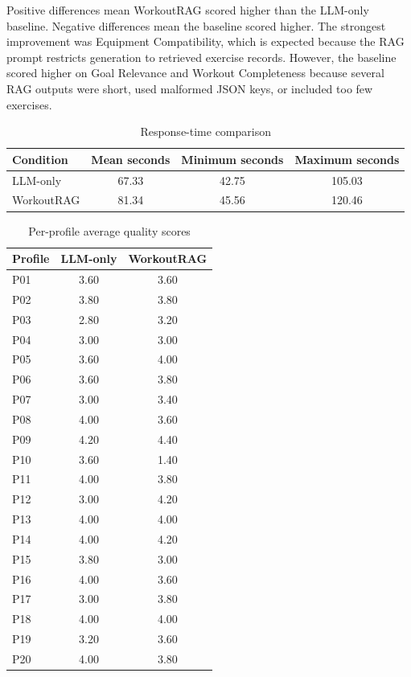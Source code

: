 \documentclass[12pt]{article}
\begin{document}
Positive differences mean WorkoutRAG scored higher than the LLM-only baseline. Negative differences mean the baseline scored higher. The strongest improvement was Equipment Compatibility, which is expected because the RAG prompt restricts generation to retrieved exercise records. However, the baseline scored higher on Goal Relevance and Workout Completeness because several RAG outputs were short, used malformed JSON keys, or included too few exercises.

\begin{table}[h]
\centering
\caption{Response-time comparison}
\begin{tabular}{lccc}
\toprule
Condition & Mean seconds & Minimum seconds & Maximum seconds \\
\midrule
LLM-only & 67.33 & 42.75 & 105.03 \\
WorkoutRAG & 81.34 & 45.56 & 120.46 \\
\bottomrule
\end{tabular}
\end{table}

\begin{longtable}{lcc}
\caption{Per-profile average quality scores} \\
\toprule
Profile & LLM-only & WorkoutRAG \\
\midrule
P01 & 3.60 & 3.60 \\
P02 & 3.80 & 3.80 \\
P03 & 2.80 & 3.20 \\
P04 & 3.00 & 3.00 \\
P05 & 3.60 & 4.00 \\
P06 & 3.60 & 3.80 \\
P07 & 3.00 & 3.40 \\
P08 & 4.00 & 3.60 \\
P09 & 4.20 & 4.40 \\
P10 & 3.60 & 1.40 \\
P11 & 4.00 & 3.80 \\
P12 & 3.00 & 4.20 \\
P13 & 4.00 & 4.00 \\
P14 & 4.00 & 4.20 \\
P15 & 3.80 & 3.00 \\
P16 & 4.00 & 3.60 \\
P17 & 3.00 & 3.80 \\
P18 & 4.00 & 4.00 \\
P19 & 3.20 & 3.60 \\
P20 & 4.00 & 3.80 \\
\bottomrule
\end{longtable}
\end{document}
